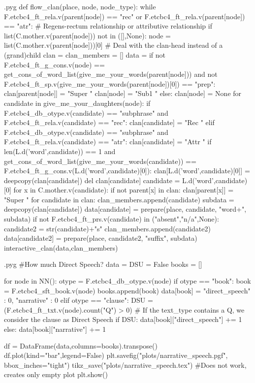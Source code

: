 \documentclass{report}
\makeatletter
\newenvironment{python}{%
  \VerbatimEnvironment
  \minted@resetoptions
  \setkeys{minted@opt}{}
      \begin{VerbatimOut}{\jobname.pyg}}
{%
      \end{VerbatimOut}
      \minted@pygmentize{python}
      \DeleteFile{\jobname.pyg}}
\makeatother
\begin{document}
\begin{python}
def flow_clan(place, node, node_type):
    while F.etcbc4_ft_rela.v(parent[node]) == "rec" or F.etcbc4_ft_rela.v(parent[node]) == "atr": # Regens-rectum relationship or attributive relationship
        if list(C.mother.v(parent[node])) not in ([],None):
            node = list(C.mother.v(parent[node]))[0] # Deal with the clan-head instead of a (grand)child
    clan = {}
    clan_members = []
    data = {}
    if not F.etcbc4_ft_g_cons.v(node) == get_cons_of_word_list(give_me_your_words(parent[node])) and not F.etcbc4_ft_sp.v(give_me_your_words(parent[node])[0]) == "prep":
        clan[parent[node]] = "Super "
        clan[node] = "Sub1 "
    else:
        clan[node] = None
    for candidate in give_me_your_daughters(node):
        if F.etcbc4_db_otype.v(candidate) == "subphrase" and F.etcbc4_ft_rela.v(candidate) == "rec":
            clan[candidate] = "Rec "
        elif F.etcbc4_db_otype.v(candidate) == "subphrase" and F.etcbc4_ft_rela.v(candidate) == "atr":
            clan[candidate] = "Attr "
        if len(L.d('word',candidate)) == 1 and get_cons_of_word_list(give_me_your_words(candidate)) == F.etcbc4_ft_g_cons.v(L.d('word',candidate)[0]):
            clan[L.d('word',candidate)[0]] = deepcopy(clan[candidate])
            del clan[candidate]
            candidate = L.d('word',candidate)[0] 
        for x in C.mother.v(candidate):
            if not parent[x] in clan:
                clan[parent[x]] = "Super "
    for candidate in clan:
        clan_members.append(candidate)
        subdata = deepcopy(clan[candidate])
        data[candidate] = prepare(place, candidate, "word+", subdata)
        if not F.etcbc4_ft_prs.v(candidate) in ("absent","n/a",None):
            candidate2 = str(candidate)+"s"
            clan_members.append(candidate2)
            data[candidate2] = prepare(place, candidate2, "suffix", subdata)
    interactive_clan(data,clan_members)

\end{python}
\begin{python}
#How much Direct Speech?
data = {}
DSU = False
books = []

for node in NN():
    otype = F.etcbc4_db_otype.v(node)
    if otype == "book":
        book = F.etcbc4_sft_book.v(node)
        books.append(book)
        data[book] = {"direct_speech" : 0, "narrative" : 0}
    elif otype == "clause":
        DSU = (F.etcbc4_ft_txt.v(node).count("Q") > 0)    # If the text_type contains a Q, we consider the clause as Direct Speech
        if DSU:
            data[book]["direct_speech"] += 1
        else:
            data[book]["narrative"] += 1

df = DataFrame(data,columns=books).transpose()
df.plot(kind="bar",legend=False)
plt.savefig("plots/narrative_speech.pgf", bbox_inches="tight")
tikz_save("plots/narrative_speech.tex") #Does not work, creates only empty plot
plt.show()

\end{python}
\end{document}
